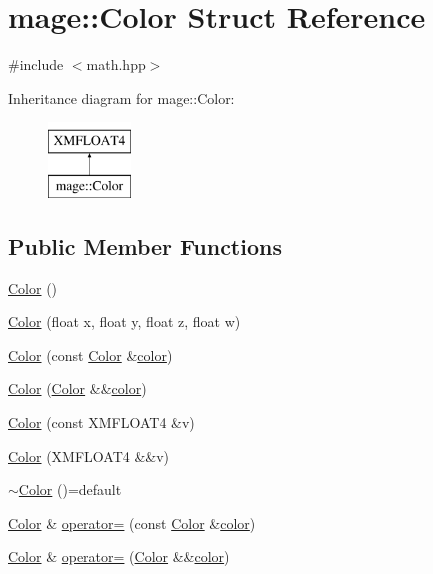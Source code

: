 \hypertarget{structmage_1_1_color}{}\section{mage\+:\+:Color Struct Reference}
\label{structmage_1_1_color}


{\ttfamily \#include $<$math.\+hpp$>$}

Inheritance diagram for mage\+:\+:Color\+:\begin{figure}[H]
\begin{center}
\leavevmode
\includegraphics[height=2.000000cm]{structmage_1_1_color}
\end{center}
\end{figure}
\subsection*{Public Member Functions}
\begin{DoxyCompactItemize}
\item 
\hyperlink{structmage_1_1_color_aacf48e59425346eb80e7592bbcd6b55d}{Color} ()
\item 
\hyperlink{structmage_1_1_color_ae906a0c456f1d21df8a6d5476918a913}{Color} (float x, float y, float z, float w)
\item 
\hyperlink{structmage_1_1_color_aabf202b6ec0c2d1fc788c9bc69f185ff}{Color} (const \hyperlink{structmage_1_1_color}{Color} \&\hyperlink{namespacemage_a56eceea5a9bceb2b56073f3ea4945781}{color})
\item 
\hyperlink{structmage_1_1_color_abb0838db7c77053894fcf11b03284549}{Color} (\hyperlink{structmage_1_1_color}{Color} \&\&\hyperlink{namespacemage_a56eceea5a9bceb2b56073f3ea4945781}{color})
\item 
\hyperlink{structmage_1_1_color_a90a9fab9b5dff127bf2ead12a46d531f}{Color} (const X\+M\+F\+L\+O\+A\+T4 \&v)
\item 
\hyperlink{structmage_1_1_color_a8f0d0c4359f6754d90bb2b6c077a11e3}{Color} (X\+M\+F\+L\+O\+A\+T4 \&\&v)
\item 
\hyperlink{structmage_1_1_color_aa4df1c9718b7846adf77fbeed79ac219}{$\sim$\+Color} ()=default
\item 
\hyperlink{structmage_1_1_color}{Color} \& \hyperlink{structmage_1_1_color_a006c8ce9bf69e54598c5981fe79d742c}{operator=} (const \hyperlink{structmage_1_1_color}{Color} \&\hyperlink{namespacemage_a56eceea5a9bceb2b56073f3ea4945781}{color})
\item 
\hyperlink{structmage_1_1_color}{Color} \& \hyperlink{structmage_1_1_color_afe64cf3cf65b5812ac35674917abb12c}{operator=} (\hyperlink{structmage_1_1_color}{Color} \&\&\hyperlink{namespacemage_a56eceea5a9bceb2b56073f3ea4945781}{color})
\end{DoxyCompactItemize}


